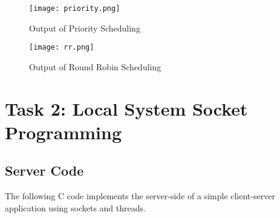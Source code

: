 \documentclass[12pt]{article}
\begin{document}
\begin{figure}[h!]
    \centering
    \texttt{[image: priority.png]}
    \caption{Output of Priority Scheduling}
    \label{fig:priority_output}
\end{figure}

\begin{figure}[h!]
    \centering
    \texttt{[image: rr.png]}
    \caption{Output of Round Robin Scheduling}
    \label{fig:rr_output}
\end{figure}

\section{Task 2: Local System Socket Programming}

\subsection{Server Code}

The following C code implements the server-side of a simple client-server application using sockets and threads.
\end{document}

